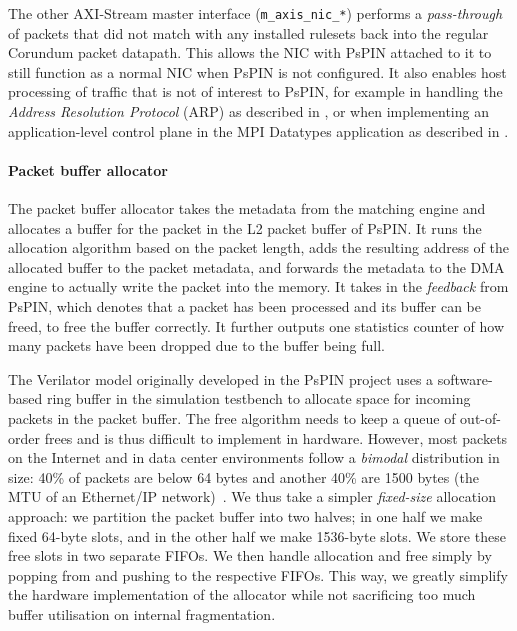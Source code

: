 The other AXI-Stream master interface (\texttt{m\_\-axis\_\-nic\_\-*}) performs a \emph{pass-through} of packets that did not match with any installed rulesets back into the regular Corundum packet datapath.  This allows the NIC with PsPIN attached to it to still function as a normal NIC when PsPIN is not configured.  It also enables host processing of traffic that is not of interest to PsPIN, for example in handling the \emph{Address Resolution Protocol} (ARP) as described in , or when implementing an application-level control plane in the MPI Datatypes application as described in .

\paragraph{Packet buffer allocator} The packet buffer allocator takes the metadata from the matching engine and allocates a buffer for the packet in the L2 packet buffer of PsPIN.  It runs the allocation algorithm based on the packet length, adds the resulting address of the allocated buffer to the packet metadata, and forwards the metadata to the DMA engine to actually write the packet into the memory.  It takes in the \emph{feedback} from PsPIN, which denotes that a packet has been processed and its buffer can be freed, to free the buffer correctly.  It further outputs one statistics counter of how many packets have been dropped due to the buffer being full.

The Verilator model originally developed in the PsPIN project uses a software-based ring buffer in the simulation testbench to allocate space for incoming packets in the packet buffer.  The free algorithm needs to keep a queue of out-of-order frees and is thus difficult to implement in hardware.  However, most packets on the Internet and in data center environments follow a \emph{bimodal} distribution in size: 40\% of packets are below 64 bytes and another 40\% are 1500 bytes (the MTU of an Ethernet/IP network)~\cite{john_analysis_2007,benson_understanding_2009}.  We thus take a simpler \emph{fixed-size} allocation approach: we partition the packet buffer into two halves; in one half we make fixed 64-byte slots, and in the other half we make 1536-byte slots.  We store these free slots in two separate FIFOs.  We then handle allocation and free simply by popping from and pushing to the respective FIFOs.  This way, we greatly simplify the hardware implementation of the allocator while not sacrificing too much buffer utilisation on internal fragmentation.

